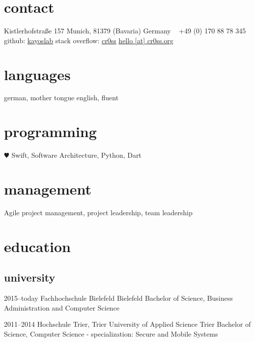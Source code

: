 \documentclass[]{friggeri-cv} %
\begin{document}


\begin{aside} %
	\section{contact}
	Kistlerhofstraße 157
	Munich, 81379 
	(Bavaria) Germany
	~
	+49 (0) 170 88 78 345
	github: \href{https://github.com/kayoslab}{kayoslab}
	stack overflow: \href{https://stackoverflow.com/story/cr0ss}{cr0ss}
	\href{mailto:hello@cr0ss.org}{hello [at] cr0ss.org}
	~
	\section{languages}
	german, mother tongue
	english, fluent
	\section{programming}
	{\color{red} $\varheartsuit$} Swift,
	Software Architecture,
	Python, Dart
	\section{management}
	Agile project management,
	project leadership,
	team leadership
\end{aside}


\section{education}

\subsection{university}

\begin{entrylist}
	
	\entry
	{2015--today}
	{Fachhochschule Bielefeld}
	{Bielefeld}
	{Bachelor of Science, Business Administration and Computer Science}
	
	
	\entry
	{2011--2014}
	{Hochschule Trier, Trier University of Applied Science}
	{Trier}
	{Bachelor of Science, Computer Science - specialization: Secure and Mobile Systems}
	
	
\end{entrylist}
\end{document}
